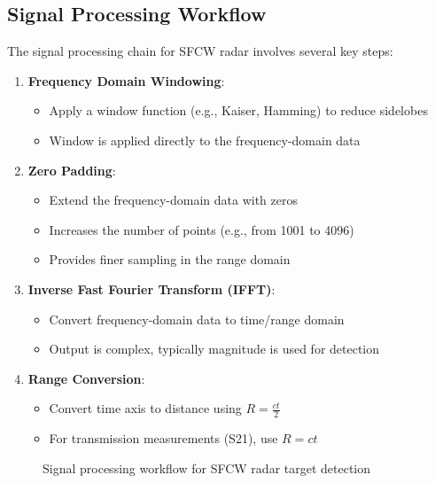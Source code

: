 \documentclass[12pt,a4paper]{article}
\begin{document}
\subsection{Signal Processing Workflow}

The signal processing chain for SFCW radar involves several key steps:

\begin{enumerate}
    \item \textbf{Frequency Domain Windowing}:
    \begin{itemize}
        \item Apply a window function (e.g., Kaiser, Hamming) to reduce sidelobes
        \item Window is applied directly to the frequency-domain data
    \end{itemize}
    
    \item \textbf{Zero Padding}:
    \begin{itemize}
        \item Extend the frequency-domain data with zeros
        \item Increases the number of points (e.g., from 1001 to 4096)
        \item Provides finer sampling in the range domain
    \end{itemize}
    
    \item \textbf{Inverse Fast Fourier Transform (IFFT)}:
    \begin{itemize}
        \item Convert frequency-domain data to time/range domain
        \item Output is complex, typically magnitude is used for detection
    \end{itemize}
    
    \item \textbf{Range Conversion}:
    \begin{itemize}
        \item Convert time axis to distance using $R = \frac{ct}{2}$
        \item For transmission measurements (S21), use $R = ct$
    \end{itemize}
\end{enumerate}

\begin{figure}[H]
    \centering
    \caption{Signal processing workflow for SFCW radar target detection}
    \label{fig:processing_chain}
\end{figure}
\end{document}

